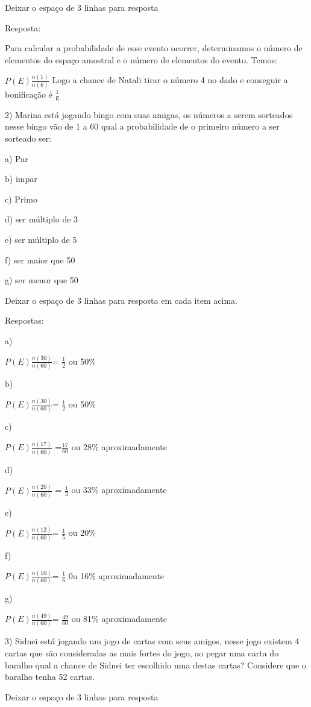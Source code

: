 {Deixar o espaço de 3 linhas para resposta

Resposta:

Para calcular a probabilidade de esse evento ocorrer, determinamos o
número de elementos do espaço amostral e o número de elementos do
evento. Temos:

\(P(E)\frac{n(1)}{n(6)}\) Logo a chance de Natali tirar o número 4 no
dado e conseguir a bonificação é \(\frac{1}{6}\)

2) Marina está jogando bingo com suas amigas, os números a serem
sorteados nesse bingo vão de 1 a 60 qual a probabilidade de o primeiro
número a ser sorteado ser:

a) Par

b) impar

c) Primo

d) ser múltiplo de 3

e) ser múltiplo de 5

f) ser maior que 50

g) ser menor que 50

Deixar o espaço de 3 linhas para resposta em cada item acima.

Respostas:

a)

\(P(E)\frac{n(30)}{n(60)}\)= \(\frac{1}{2}\) ou 50\%

b)

\(P(E)\frac{n(30)}{n(60)}\)= \(\frac{1}{2}\) ou 50\%

c)

\(P(E)\frac{n(17)}{n(60)}\) =\(\frac{17}{60}\) ou 28\% aproximadamente

d)

\(P(E)\frac{n(20)}{n(60)}\) = \(\frac{1}{3}\) ou 33\% aproximadamente

e)

\(P(E)\frac{n(12)}{n(60)}\)= \(\frac{1}{5}\) ou 20\%

f)

\(P(E)\frac{n(10)}{n(60)}\)= \(\frac{1}{6}\) 0u 16\% aproximadamente

g)

\(P(E)\frac{n(49)}{n(60)}\)= \(\frac{49}{60}\) ou 81\% aproximadamente

3) Sidnei está jogando um jogo de cartas com seus amigos, nesse jogo
existem 4 cartas que são consideradas as mais fortes do jogo, ao pegar
uma carta do baralho qual a chance de Sidnei ter escolhido uma destas
cartas? Considere que o baralho tenha 52 cartas.

Deixar o espaço de 3 linhas para resposta

}

